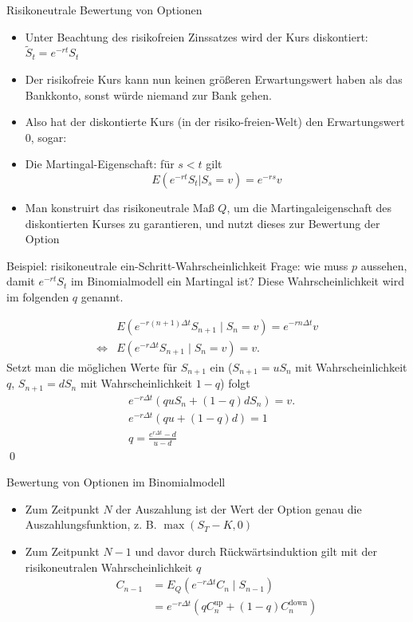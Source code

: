 \documentclass{beamer}
\begin{document}
\begin{frame}{Risikoneutrale Bewertung von Optionen}
  \begin{itemize}
      \item Unter Beachtung des risikofreien Zinssatzes wird der Kurs diskontiert: $\tilde S_t = e^{-r t} S_t$
      \item Der risikofreie Kurs kann nun keinen größeren Erwartungswert haben als das Bankkonto, sonst würde niemand zur Bank gehen.
      \item Also hat der diskontierte Kurs (in der risiko-freien-Welt) den Erwartungswert $0$, sogar:
      \item Die Martingal-Eigenschaft: für $s < t$ gilt $$E(e^{-rt}S_t | S_s = v) = e^{-rs} v$$
      \pause
      \item Man konstruirt das risikoneutrale Maß $Q$, um die Martingaleigenschaft des diskontierten Kurses zu garantieren, und nutzt dieses zur Bewertung der Option
  \end{itemize}
\end{frame}

\begin{frame}{Beispiel: risikoneutrale ein-Schritt-Wahrscheinlichkeit}
Frage: wie muss $p$ aussehen, damit $e^{-r t} S_t$ im Binomialmodell ein Martingal ist? Diese Wahrscheinlichkeit wird im folgenden $q$ genannt.

$$
\begin{aligned}
&E(e^{-r (n+1) \Delta t} S_{n+1} \mid S_n = v) = e^{-r n \Delta t} v
\\ 
\iff &E(e^{-r \Delta t} S_{n+1} \mid S_n=v) = v.
\end{aligned}
$$
Setzt man die möglichen Werte für $S_{n+1}$ ein ($S_{n+1} = u S_n$ mit Wahrscheinlichkeit $q$, $S_{n+1} = d S_n$ mit Wahrscheinlichkeit $1-q$) folgt
$$
\begin{aligned}
&e^{-r \Delta t} \left( q u S_n + (1-q) d S_n \right) = v.
\\
&e^{-r \Delta t} \left( q u + (1-q) d \right) = 1
\\
&q = \frac{e^{r \Delta t} - d}{u - d}
\end{aligned}
$$ \qed
\end{frame}

\begin{frame}{Bewertung von Optionen im Binomialmodell}
  \begin{itemize}
      \item Zum Zeitpunkt $N$ der Auszahlung ist der Wert der Option genau die Auszahlungsfunktion, z. B. $\max(S_T - K, 0)$
      \item Zum Zeitpunkt $N-1$ und davor durch Rückwärtsinduktion gilt mit der risikoneutralen Wahrscheinlichkeit $q$
      $$
      \begin{aligned}
C_{n-1} &= E_Q(e^{-r \Delta t} C_{n} \mid S_{n-1}) \\
&= e^{-r \Delta t} \left( q C_{n}^\text{up} + (1-q) C_{n}^\text{down} \right)
      \end{aligned}
      $$
  \end{itemize}
\end{frame}
\end{document}
